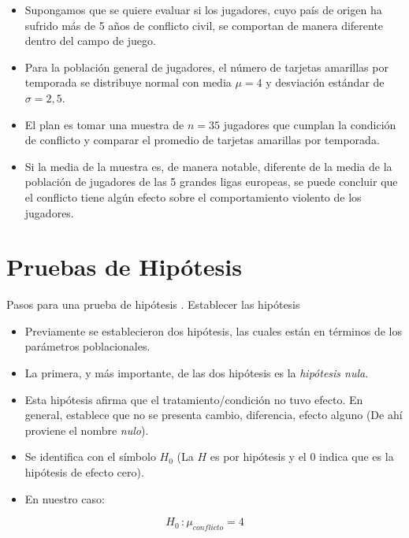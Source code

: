 \documentclass{beamer}
\begin{document}
\begin{frame}
\begin{itemize}
\justifying
\item Supongamos que se quiere evaluar si los jugadores, cuyo país de origen ha sufrido más de 5 años de conflicto civil, se comportan de manera diferente dentro del campo de juego.
\item Para la población general de jugadores, el número de tarjetas amarillas por temporada se distribuye normal con media $\mu=4$ y desviación estándar de $\sigma=2,5$.
\item El plan es tomar una muestra de $n=35$ jugadores que cumplan la condición de conflicto y comparar el promedio de tarjetas amarillas por temporada. 
\item Si la media de la muestra es, de manera notable, diferente de la media de la población de jugadores de las 5 grandes ligas europeas, se puede concluir que el conflicto tiene algún efecto sobre el comportamiento violento de los jugadores. 
\end{itemize}
\end{frame}

\section{Pruebas de Hipótesis}

\begin{frame}{Pasos para una prueba de hipótesis}
{. Establecer las hipótesis}
\begin{itemize}
	\justifying
\item Previamente se establecieron dos hipótesis, las cuales están en términos de los parámetros poblacionales.
\item La primera, y más importante, de las dos hipótesis es la \emph{hipótesis nula}.
\item Esta hipótesis afirma que el tratamiento/condición no tuvo efecto. En general, establece que no se presenta cambio, diferencia, efecto alguno (De ahí proviene el nombre \emph{nulo}).
\item Se identifica con el símbolo $H_0$ (La $H$ es por hipótesis y el $0$ indica que es la hipótesis de efecto cero).
\item En nuestro caso:

\end{itemize}
$$H_0 \, : \mu_{conflicto}=4$$

\end{frame}
\end{document}
